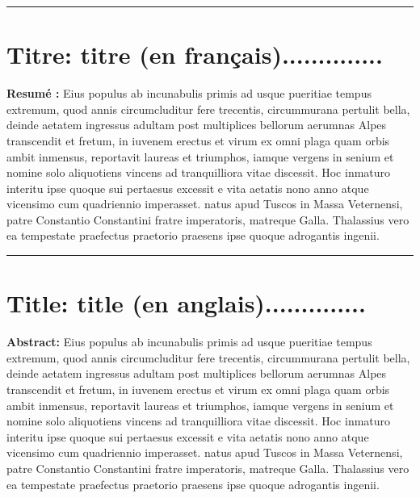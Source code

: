 \par\nobreak
\hspace{- 1.75cm}\noindent \textcolor{mathSTIC-Color}{\rule{\textwidth }{0.2cm}}  %
\section*{\textcolor{mathSTIC-Color}{Titre}: titre (en fran\c cais)..............}
\noindent {}
\begin{multicols}{2}
\noindent \textbf{Resum\'{e} : }Eius populus ab incunabulis primis ad usque pueritiae tempus extremum, quod annis circumcluditur fere trecentis, circummurana pertulit bella, deinde aetatem ingressus adultam post multiplices bellorum aerumnas Alpes transcendit et fretum, in iuvenem erectus et virum ex omni plaga quam orbis ambit inmensus, reportavit laureas et triumphos, iamque vergens in senium et nomine solo aliquotiens vincens ad tranquilliora vitae discessit.
Hoc inmaturo interitu ipse quoque sui pertaesus excessit e vita aetatis nono anno atque vicensimo cum quadriennio imperasset. natus apud Tuscos in Massa Veternensi, patre Constantio Constantini fratre imperatoris, matreque Galla.
Thalassius vero ea tempestate praefectus praetorio praesens ipse quoque adrogantis ingenii. 
\end{multicols}




\hspace{- 1.75cm}\noindent \textcolor{mathSTIC-Color}{\rule{\linewidth}{0.2cm}}
\section*{\textcolor{mathSTIC-Color}{Title}: title (en anglais)..............}
\noindent {}
\begin{multicols}{2}
\noindent \textbf{Abstract: }Eius populus ab incunabulis primis ad usque pueritiae tempus extremum, quod annis circumcluditur fere trecentis, circummurana pertulit bella, deinde aetatem ingressus adultam post multiplices bellorum aerumnas Alpes transcendit et fretum, in iuvenem erectus et virum ex omni plaga quam orbis ambit inmensus, reportavit laureas et triumphos, iamque vergens in senium et nomine solo aliquotiens vincens ad tranquilliora vitae discessit.
Hoc inmaturo interitu ipse quoque sui pertaesus excessit e vita aetatis nono anno atque vicensimo cum quadriennio imperasset. natus apud Tuscos in Massa Veternensi, patre Constantio Constantini fratre imperatoris, matreque Galla.	Thalassius vero ea tempestate praefectus praetorio praesens ipse quoque adrogantis ingenii.
\end{multicols}
